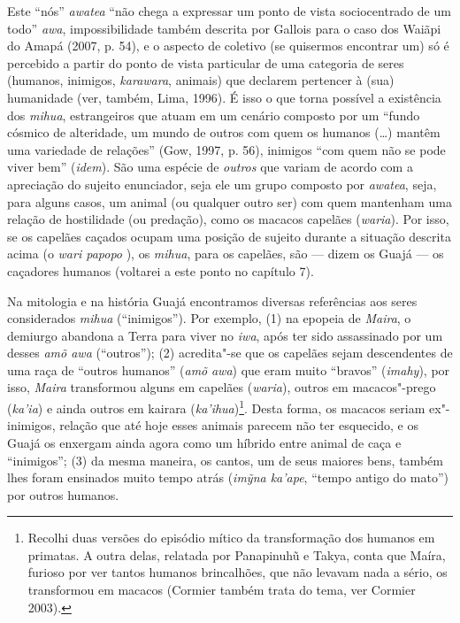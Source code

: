 Este ``nós'' \emph{awatea} ``não chega a expressar um ponto de vista
sociocentrado de um todo'' \emph{awa}, impossibilidade também descrita
por Gallois para o caso dos Waiãpi do Amapá (2007, p. 54), e o aspecto
de coletivo (se quisermos encontrar um) só é percebido a partir do ponto
de vista particular de uma categoria de seres (humanos, inimigos,
\emph{karawara}, animais) que declarem pertencer à (sua) humanidade
(ver, também, Lima, 1996). É isso o que torna possível a existência dos
\emph{mihua}, estrangeiros que atuam em um cenário composto por um
``fundo cósmico de alteridade, um mundo de outros com quem os humanos
 (\ldots{}) mantêm uma variedade de relações'' (Gow, 1997, p. 56), inimigos
``com quem não se pode viver bem'' (\emph{idem}). São uma espécie de
\emph{outros} que variam de acordo com a apreciação do sujeito
enunciador, seja ele um grupo composto por \emph{awatea}, seja, para
alguns casos, um animal (ou qualquer outro ser) com quem mantenham uma
relação de hostilidade (ou predação), como os macacos capelães
(\emph{waria}). Por isso, se os capelães caçados ocupam uma posição de
sujeito durante a situação descrita acima (o \emph{wari papopo} ), os
\emph{mihua}, para os capelães, são --- dizem os Guajá --- os caçadores
humanos (voltarei a este ponto no capítulo 7).

Na mitologia e na história Guajá encontramos diversas referências aos
seres considerados \emph{mihua} (``inimigos''). Por exemplo, (1) na
epopeia de \emph{Maira}, o demiurgo abandona a Terra para viver no
\emph{iwa}, após ter sido assassinado por um desses \emph{amõ awa}
(``outros''); (2) acredita"-se que os capelães sejam descendentes de uma
raça de ``outros humanos'' (\emph{amõ} \emph{awa}) que eram muito ``bravos''
(\emph{imahy}), por isso, \emph{Maira} transformou alguns em capelães
(\emph{waria}), outros em macacos"-prego (\emph{ka'ia}) e ainda outros em
kairara (\emph{ka'ihua})\footnote{Recolhi duas versões do episódio
  mítico da transformação dos humanos em primatas. A outra delas,
  relatada por Panapinuhũ e Takya, conta que Maíra, furioso por ver
  tantos humanos brincalhões, que não levavam nada a sério, os
  transformou em macacos (Cormier também trata do tema, ver Cormier
  2003).}. Desta forma, os macacos seriam ex"-inimigos, relação que até
hoje esses animais parecem não ter esquecido, e os Guajá os enxergam
ainda agora como um híbrido entre animal de caça e ``inimigos''; (3) da
mesma maneira, os cantos, um de seus maiores bens, também lhes foram
ensinados muito tempo atrás (\emph{imỹna ka'ape}, ``tempo antigo do
mato'') por outros humanos.

